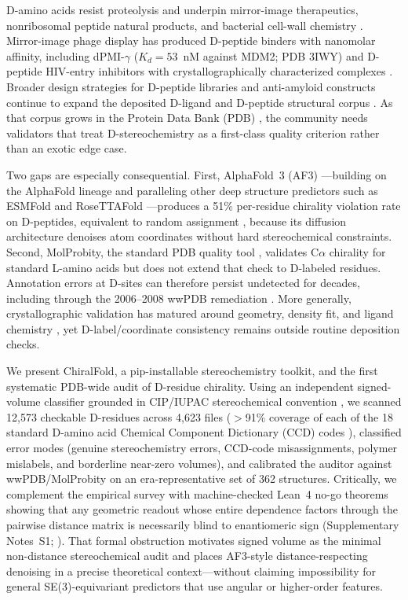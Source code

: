 \documentclass[numsec,webpdf,modern,large,namedate]{oup-authoring-template}
\DeclareRobustCommand{\repopath}[1]{\path{#1}}
\begin{document}
D-amino acids resist proteolysis and underpin mirror-image therapeutics, nonribosomal peptide natural products, and bacterial cell-wall chemistry \citep{cava2011,miyamoto2021}. Mirror-image phage display has produced D-peptide binders with nanomolar affinity, including dPMI-$\gamma$ ($K_d=53$~nM against MDM2; PDB 3IWY) \citep{liu2010} and D-peptide HIV-entry inhibitors with crystallographically characterized complexes \citep{welch2009}. Broader design strategies for D-peptide libraries and anti-amyloid constructs continue to expand the deposited D-ligand and D-peptide structural corpus \citep{funke2010,garton2018}. As that corpus grows in the Protein Data Bank (PDB) \citep{berman2000,wwpdb2019}, the community needs validators that treat D-stereochemistry as a first-class quality criterion rather than an exotic edge case.

Two gaps are especially consequential. First, AlphaFold~3 (AF3) \citep{abramson2024}---building on the AlphaFold lineage \citep{jumper2021} and paralleling other deep structure predictors such as ESMFold and RoseTTAFold \citep{lin2023,baek2021}---produces a 51\% per-residue chirality violation rate on D-peptides, equivalent to random assignment \citep{childs2025}, because its diffusion architecture denoises atom coordinates without hard stereochemical constraints. Second, MolProbity, the standard PDB quality tool \citep{chen2010,lovell2003,williams2018}, validates C$\alpha$ chirality for standard L-amino acids but does not extend that check to D-labeled residues. Annotation errors at D-sites can therefore persist undetected for decades, including through the 2006--2008 wwPDB remediation \citep{henrick2008}. More generally, crystallographic validation has matured around geometry, density fit, and ligand chemistry \citep{read2011,gore2017,outcome2016}, yet D-label/coordinate consistency remains outside routine deposition checks.

We present ChiralFold, a pip-installable stereochemistry toolkit, and the first systematic PDB-wide audit of D-residue chirality. Using an independent signed-volume classifier grounded in CIP/IUPAC stereochemical convention \citep{cip2013}, we scanned 12{,}573 checkable D-residues across 4{,}623 files ($>$91\% coverage of each of the 18 standard D-amino acid Chemical Component Dictionary (CCD) codes \citep{shao2015}), classified error modes (genuine stereochemistry errors, CCD-code misassignments, polymer mislabels, and borderline near-zero volumes), and calibrated the auditor against wwPDB/MolProbity on an era-representative set of 362 structures. Critically, we complement the empirical survey with machine-checked Lean~4 no-go theorems showing that any geometric readout whose entire dependence factors through the pairwise distance matrix is necessarily blind to enantiomeric sign (Supplementary Notes~S1; \repopath{formal/chirality_nogo/}). That formal obstruction motivates signed volume as the minimal non-distance stereochemical audit and places AF3-style distance-respecting denoising in a precise theoretical context---without claiming impossibility for general SE(3)-equivariant predictors that use angular or higher-order features.
\end{document}
